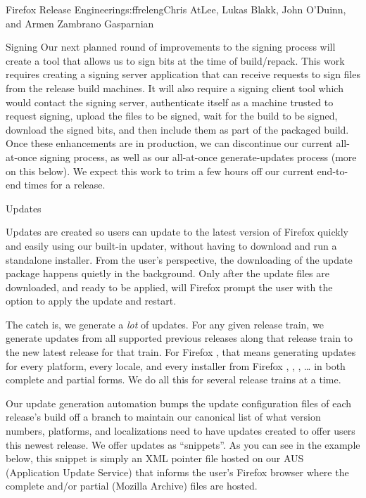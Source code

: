 \begin{aosachapter}{Firefox Release Engineering}{s:ffreleng}{Chris AtLee, Lukas Blakk, John O'Duinn, and Armen Zambrano Gasparnian}
\begin{aosasect1}{Signing}
Our next planned round of improvements to the signing process
will create a tool that allows us to sign bits at the time of
build/repack. This work requires creating a signing server
application that can receive requests to sign files from
the release build machines.  It will also
require a signing client tool which would contact the signing
server, authenticate itself as a machine trusted to request signing,
upload the files to be signed, wait for the build to be signed,
download the signed bits, and then include them as part of the
packaged build.  Once these enhancements are in production, we can
discontinue our current all-at-once signing process, as well as our
all-at-once generate-updates process (more on this below). We expect this
work to trim a few hours off our current end-to-end times for a
release.
  
\end{aosasect1}

\begin{aosasect1}{Updates}

Updates are created so users can update to the latest version of
Firefox quickly and easily using our built-in updater, without having
to download and run a standalone installer.
From the user's perspective, the downloading of the update
package happens quietly in the background. Only after the update files
are downloaded, and ready to be applied, will Firefox prompt the user
with the option to apply the update and restart.

The catch is, we generate a \emph{lot} of updates. For any given release
train, we generate updates from all supported previous releases along
that release train to the new latest release for that train.  For Firefox , that
means generating updates for every platform, every locale, and every
installer from Firefox , , , {\ldots} 
 in both complete and partial forms. We do all this for several
release trains at a time.

Our update generation automation bumps the update configuration files
of each release's build off a branch to maintain our canonical list of
what version numbers, platforms, and localizations need to have
updates created to offer users this newest release. We offer updates
as ``snippets''. As you can see in the example below, this snippet is
simply an XML pointer file hosted on our AUS (Application Update
Service) that informs the user's Firefox browser where the complete
and/or partial  (Mozilla Archive) files are hosted.


\end{aosasect1}
\end{aosachapter}
